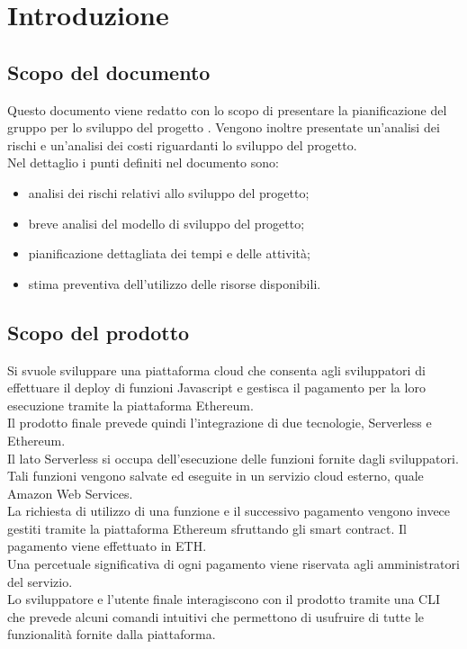 \section{Introduzione}
\subsection{Scopo del documento}
Questo documento viene redatto con lo scopo di presentare la pianificazione del gruppo \Gruppo{} per lo sviluppo del progetto \NomeProgetto{}. Vengono inoltre presentate un'analisi dei rischi e un'analisi dei costi riguardanti lo sviluppo del progetto.\\
Nel dettaglio i punti definiti nel documento sono:
\begin{itemize}
	\item analisi dei rischi relativi allo sviluppo del progetto;
	\item breve analisi del modello di sviluppo del progetto;
	\item pianificazione dettagliata dei tempi e delle attività;
	\item stima preventiva dell'utilizzo delle risorse disponibili.
\end{itemize}
\subsection{Scopo del prodotto}
Si svuole sviluppare una piattaforma cloud che consenta agli sviluppatori di effettuare il deploy di funzioni Javascript e gestisca il pagamento per la loro esecuzione tramite la piattaforma Ethereum.\\
Il prodotto finale prevede quindi l'integrazione di due tecnologie, Serverless e Ethereum.\\
Il lato Serverless si occupa dell'esecuzione delle funzioni fornite dagli sviluppatori. Tali funzioni vengono salvate ed eseguite in un servizio cloud esterno, quale Amazon Web Services.\\
La richiesta di utilizzo di una funzione e il successivo pagamento vengono invece gestiti tramite la piattaforma Ethereum sfruttando gli smart contract. Il pagamento viene effettuato in ETH.\\
Una percetuale significativa di ogni pagamento viene riservata agli amministratori del servizio.\\
Lo sviluppatore e l'utente finale interagiscono con il prodotto tramite una CLI che prevede alcuni comandi intuitivi che permettono di usufruire di tutte le funzionalità fornite dalla piattaforma.
